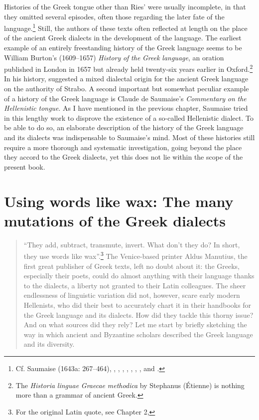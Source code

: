 Histories of the Greek tongue other than Ries’ were usually incomplete, in that they omitted several episodes, often those regarding the later fate of the language.\footnote{Cf. Saumaise (1643a: 267–464), \citet{Burton1657}, \citet{LagerlööfPalmroot1685}, \citet{Rodigast1685}, \citet{Eling1691}, \citet{Florinus1707}, \citet{Reinhard1724}, \citet{MuntheHeiberg1748}, and \citet{Harles1778}.} Still, the authors of these texts often reflected at length on the place of the ancient Greek dialects in the development of the language. The earliest example of an entirely freestanding history of the Greek language seems to be William Burton’s (1609–1657) \textit{History} \textit{of} \textit{the} \textit{Greek} \textit{language}, an oration published in London in 1657 but already held twenty-six years earlier in Oxford.\footnote{The \textit{Historia} \textit{linguae} \textit{Graecae} \textit{methodica} by Stephanus (Étienne) \citet{Simon1615} is nothing more than a grammar of ancient Greek.} In his history, \citet[27]{Burton1657} suggested a mixed dialectal origin for the ancient Greek language on the authority of Strabo. A second important but somewhat peculiar example of a history of the Greek language is Claude de Saumaise’s \textit{Commentary} \textit{on} \textit{the} \textit{Hellenistic} \textit{tongue}. As I have mentioned in the previous chapter, Saumaise tried in this lengthy work to disprove the existence of a so-called Hellenistic dialect. To be able to do so, an elaborate description of the history of the Greek language and its dialects was indispensable to Saumaise’s mind. Most of these histories still require a more thorough and systematic investigation, going beyond the place they accord to the Greek dialects, yet this does not lie within the scope of the present book.

\chapter{Using words like wax: The many mutations of the Greek dialects}
\begin{quote}
“They add, subtract, transmute, invert. What don’t they do? In short, they use words like wax”.\footnote{ \textrm{For the original Latin quote, see Chapter 2, }} The Venice-based printer Aldus Manutius, the first great publisher of Greek texts, left no doubt about it: the Greeks, especially their poets, could do almost anything with their language thanks to the dialects, a liberty not granted to their Latin colleagues. The sheer endlessness of linguistic variation did not, however, scare early modern Hellenists, who did their best to accurately chart it in their handbooks for the Greek language and its dialects. How did they tackle this thorny issue? And on what sources did they rely? Let me start by briefly sketching the way in which ancient and Byzantine scholars described the Greek language and its diversity.
\end{quote}

